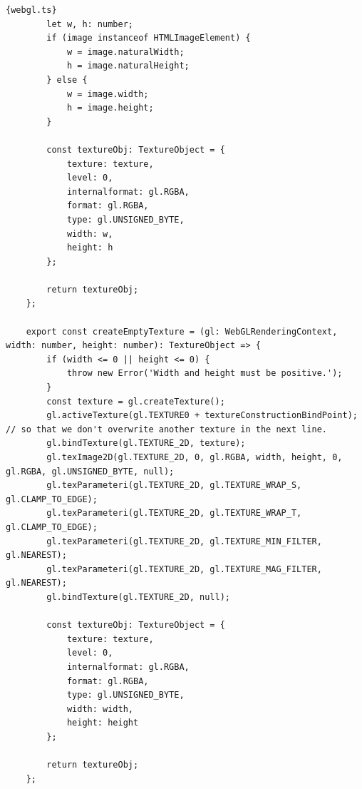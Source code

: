 \begin{lstlisting}{webgl.ts}
        let w, h: number;
        if (image instanceof HTMLImageElement) {
            w = image.naturalWidth;
            h = image.naturalHeight;
        } else {
            w = image.width;
            h = image.height;
        }
    
        const textureObj: TextureObject = {
            texture: texture,
            level: 0,
            internalformat: gl.RGBA,
            format: gl.RGBA,
            type: gl.UNSIGNED_BYTE,
            width: w,
            height: h
        };
    
        return textureObj;
    };
    
    export const createEmptyTexture = (gl: WebGLRenderingContext, width: number, height: number): TextureObject => {
        if (width <= 0 || height <= 0) {
            throw new Error('Width and height must be positive.');
        }
        const texture = gl.createTexture();
        gl.activeTexture(gl.TEXTURE0 + textureConstructionBindPoint); // so that we don't overwrite another texture in the next line.
        gl.bindTexture(gl.TEXTURE_2D, texture);
        gl.texImage2D(gl.TEXTURE_2D, 0, gl.RGBA, width, height, 0, gl.RGBA, gl.UNSIGNED_BYTE, null);
        gl.texParameteri(gl.TEXTURE_2D, gl.TEXTURE_WRAP_S, gl.CLAMP_TO_EDGE);
        gl.texParameteri(gl.TEXTURE_2D, gl.TEXTURE_WRAP_T, gl.CLAMP_TO_EDGE);
        gl.texParameteri(gl.TEXTURE_2D, gl.TEXTURE_MIN_FILTER, gl.NEAREST);
        gl.texParameteri(gl.TEXTURE_2D, gl.TEXTURE_MAG_FILTER, gl.NEAREST);
        gl.bindTexture(gl.TEXTURE_2D, null);
    
        const textureObj: TextureObject = {
            texture: texture,
            level: 0,
            internalformat: gl.RGBA,
            format: gl.RGBA,
            type: gl.UNSIGNED_BYTE,
            width: width,
            height: height
        };
    
        return textureObj;
    };
    

\end{lstlisting}
